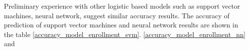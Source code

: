 \documentclass[12pt,english]{report}
\begin{document}

Preliminary experience with other logistic based models such as support vector 
machines, neural network,  suggest similar accuracy results. The accuracy of 
prediction of support vector machines and neural network results are shown in 
the table \ref{accuracy_model_enrollment_svm}.
\ref{accuracy_model_enrollment_nn} and
\end{document}

